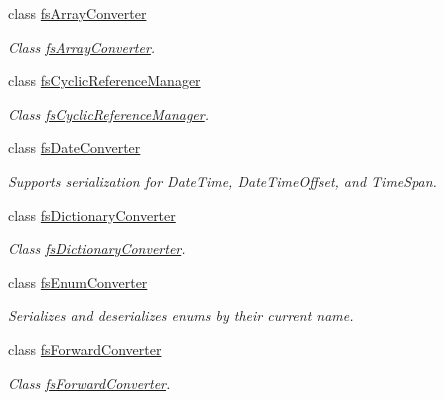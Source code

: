 \begin{DoxyCompactItemize}
\item 
class \hyperlink{class_full_serializer_1_1_internal_1_1fs_array_converter}{fs\+Array\+Converter}
\begin{DoxyCompactList}\small\item\em Class \hyperlink{class_full_serializer_1_1_internal_1_1fs_array_converter}{fs\+Array\+Converter}. \end{DoxyCompactList}\item 
class \hyperlink{class_full_serializer_1_1_internal_1_1fs_cyclic_reference_manager}{fs\+Cyclic\+Reference\+Manager}
\begin{DoxyCompactList}\small\item\em Class \hyperlink{class_full_serializer_1_1_internal_1_1fs_cyclic_reference_manager}{fs\+Cyclic\+Reference\+Manager}. \end{DoxyCompactList}\item 
class \hyperlink{class_full_serializer_1_1_internal_1_1fs_date_converter}{fs\+Date\+Converter}
\begin{DoxyCompactList}\small\item\em Supports serialization for Date\+Time, Date\+Time\+Offset, and Time\+Span. \end{DoxyCompactList}\item 
class \hyperlink{class_full_serializer_1_1_internal_1_1fs_dictionary_converter}{fs\+Dictionary\+Converter}
\begin{DoxyCompactList}\small\item\em Class \hyperlink{class_full_serializer_1_1_internal_1_1fs_dictionary_converter}{fs\+Dictionary\+Converter}. \end{DoxyCompactList}\item 
class \hyperlink{class_full_serializer_1_1_internal_1_1fs_enum_converter}{fs\+Enum\+Converter}
\begin{DoxyCompactList}\small\item\em Serializes and deserializes enums by their current name. \end{DoxyCompactList}\item 
class \hyperlink{class_full_serializer_1_1_internal_1_1fs_forward_converter}{fs\+Forward\+Converter}
\begin{DoxyCompactList}\small\item\em Class \hyperlink{class_full_serializer_1_1_internal_1_1fs_forward_converter}{fs\+Forward\+Converter}. \end{DoxyCompactList}\item 

\end{DoxyCompactItemize}
